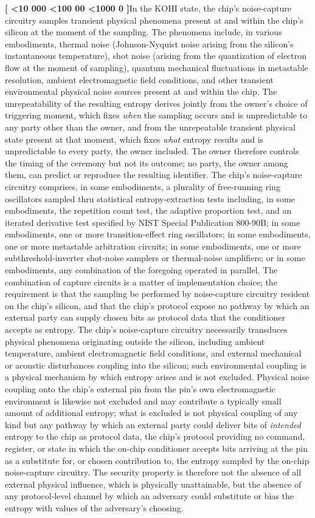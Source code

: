 \documentclass[12pt,letterpaper]{article}
\newcounter{para}
\newcommand{\padzero}{%
  \ifnum\value{para}<10 000\else%
  \ifnum\value{para}<100 00\else%
  \ifnum\value{para}<1000 0\else%
  \fi\fi\fi}
\newcommand{\para}{%
  \refstepcounter{para}\noindent\textbf{[\padzero\arabic{para}]}\hspace{0.5em}\ignorespaces}
\begin{document}
\para In the KOHI state, the chip's noise-capture circuitry samples transient physical phenomena present at and within the chip's silicon at the moment of the sampling. The phenomena include, in various embodiments, thermal noise (Johnson-Nyquist noise arising from the silicon's instantaneous temperature), shot noise (arising from the quantization of electron flow at the moment of sampling), quantum mechanical fluctuations in metastable resolution, ambient electromagnetic field conditions, and other transient environmental physical noise sources present at and within the chip. The unrepeatability of the resulting entropy derives jointly from the owner's choice of triggering moment, which fixes \emph{when} the sampling occurs and is unpredictable to any party other than the owner, and from the unrepeatable transient physical state present at that moment, which fixes \emph{what} entropy results and is unpredictable to every party, the owner included. The owner therefore controls the timing of the ceremony but not its outcome; no party, the owner among them, can predict or reproduce the resulting identifier. The chip's noise-capture circuitry comprises, in some embodiments, a plurality of free-running ring oscillators sampled thru statistical entropy-extraction tests including, in some embodiments, the repetition count test, the adaptive proportion test, and an iterated derivative test specified by NIST Special Publication 800-90B; in some embodiments, one or more transition-effect ring oscillators; in some embodiments, one or more metastable arbitration circuits; in some embodiments, one or more subthreshold-inverter shot-noise samplers or thermal-noise amplifiers; or in some embodiments, any combination of the foregoing operated in parallel. The combination of capture circuits is a matter of implementation choice; the requirement is that the sampling be performed by noise-capture circuitry resident on the chip's silicon, and that the chip's protocol expose no pathway by which an external party can supply chosen bits as protocol data that the conditioner accepts as entropy. The chip's noise-capture circuitry necessarily transduces physical phenomena originating outside the silicon, including ambient temperature, ambient electromagnetic field conditions, and external mechanical or acoustic disturbances coupling into the silicon; such environmental coupling is a physical mechanism by which entropy arises and is not excluded. Physical noise coupling onto the chip's external pin from the pin's own electromagnetic environment is likewise not excluded and may contribute a typically small amount of additional entropy; what is excluded is not physical coupling of any kind but any pathway by which an external party could deliver bits of \emph{intended} entropy to the chip as protocol data, the chip's protocol providing no command, register, or state in which the on-chip conditioner accepts bits arriving at the pin as a substitute for, or chosen contribution to, the entropy sampled by the on-chip noise-capture circuitry. The security property is therefore not the absence of all external physical influence, which is physically unattainable, but the absence of any protocol-level channel by which an adversary could substitute or bias the entropy with values of the adversary's choosing.
\end{document}

